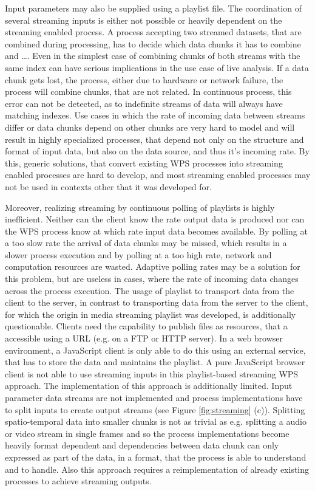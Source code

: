 	Input parameters may also be supplied using a playlist file. The coordination of several streaming inputs is either not possible or heavily dependent on the streaming enabled process. A process accepting two streamed datasets, that are combined during processing, has to decide which data chunks it has to combine and \dots. Even in the simplest case of combining chunks of both streams with the same index can have serious implications in the use case of live analysis. If a data chunk gets lost, the process, either due to hardware or network failure, the process will combine chunks, that are not related. In continuous process, this error can not be detected, as to indefinite streams of data will always have matching indexes. Use cases in which the rate of incoming data between streams differ or data chunks depend on other chunks are very hard to model and will result in highly specialized processes, that
	depend not only on the structure and format of input data, but also on the data source, and thus it's incoming rate. By this, generic solutions, that convert existing \ac{WPS} processes into streaming enabled processes are hard to develop, and most streaming enabled processes may not be used in contexts other that it was developed for.

	Moreover, realizing streaming by continuous polling of playlists is highly inefficient. Neither can the client know the rate output data is produced nor can the \ac{WPS} process know at which rate input data becomes available. By polling at a too slow rate the arrival of data chunks may be missed, which results in a slower process execution and by polling at a too high rate, network and computation resources are wasted. Adaptive polling rates may be a solution for this problem, but are useless in cases, where the rate of incoming data changes across the process execution. The usage of playlist to transport data from the client to the server, in contrast to transporting data from the server to the client, for which the origin in media streaming playlist was developed, is additionally questionable. Clients need the capability to publish files as resources, that a accessible using a URL (e.g. on a FTP or HTTP server). In a web browser environment, a JavaScript client is only able to do this using an external service, that has to store the data and maintains the playlist. A pure JavaScript browser client is not able to use streaming inputs in this playlist-based streaming \ac{WPS} approach. The implementation of this approach is additionally limited. Input parameter data streams are not implemented and process implementations have to split inputs to create output streams (see Figure \ref{fig:streaming} (c)). Splitting spatio-temporal data into smaller chunks is not as trivial as e.g. splitting a audio or video stream in single frames and so the process implementations become heavily format dependent and dependencies between data chunk can only expressed as part of the data, in a format, that the process is able to understand and to handle. Also this approach requires a reimplementation of already existing processes to achieve streaming outputs.

